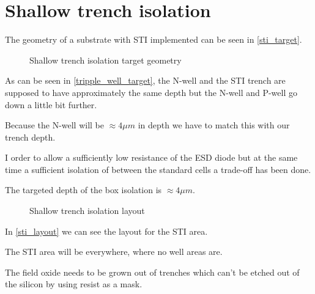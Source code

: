 \section{Shallow trench isolation}\label{sti_chapter}
The geometry of a substrate with STI implemented can be seen in \autoref{sti_target}.

\begin{figure}[H]
	\centering
	\begin{tikzpicture}[node distance = 3cm, auto, thick,scale=\CrossAndTopSectionBig, every node/.style={transform shape}]
		
	\end{tikzpicture}
	\begin{tikzpicture}[node distance = 3cm, auto, thick,scale=\CrossAndTopSectionBig, every node/.style={transform shape}]
		
	\end{tikzpicture}
	\caption{Shallow trench isolation target geometry}
	\label{sti_target}
\end{figure}

As can be seen in \autoref{tripple_well_target}, the N-well and the STI trench are supposed to have approximately the same depth but the N-well and P-well go down a little bit further.

Because the N-well will be $\approx 4 \mu m$ in depth we have to match this with our trench depth.

I order to allow a sufficiently low resistance of the ESD diode but at the same time a sufficient isolation of between the standard cells a trade-off has been done.

The targeted depth of the box isolation is $\approx 4 \mu m$.

\begin{figure}[H]
	\centering
	\begin{tikzpicture}[node distance =1cm, auto, thick,scale=\VLSILayout, every node/.style={transform shape}]
		
	\end{tikzpicture}
	\caption{Shallow trench isolation layout}
	\label{sti_layout}
\end{figure}

In \autoref{sti_layout} we can see the layout for the STI area.

The STI area will be everywhere, where no well areas are.

The field oxide needs to be grown out of trenches which can't be etched out of the silicon by using resist as a mask.

